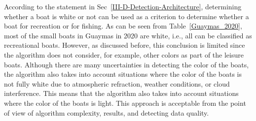 According to the statement in Sec~\ref{III-D-Detection-Architecture}, determining whether a boat is white or not can be used as a criterion to determine whether a boat for recreation or for fishing. As can be seen from Table~\ref{Guaymas_2020}, most of the small boats in Guaymas in 2020 are white, i.e., all can be classified as recreational boats. However, as discussed before, this conclusion is limited since the algorithm does not consider, for example, other colors as part of the leisure boats. Although there are many uncertainties in detecting the color of the boats, the algorithm also takes into account situations where the color of the boats is not fully white due to atmospheric refraction, weather conditions, or cloud interference. This means that the algorithm also takes into account situations where the color of the boats is light. This approach is acceptable from the point of view of algorithm complexity, results, and detecting data quality.